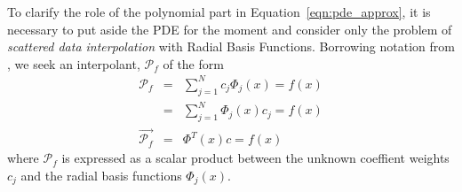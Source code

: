 \documentclass{report}
\begin{document}
{To clarify the role of the polynomial part in Equation~\ref{eqn:pde_approx}, it is necessary to
put aside the PDE for the moment and consider only the problem of \emph{scattered data 
interpolation} with Radial Basis Functions. Borrowing notation from \cite{Fasshauer2007, Iske2004}, 
we seek an interpolant, $\mathcal{P}_f$ of the form
\begin{eqnarray*}
\mathcal{P}_f  & = & \sum_{j=1}^{N} c_{j}  \Phi_j(x) = f(x) \\
			& = & \sum_{j=1}^{N} \Phi_j(x) c_{j} = f(x) \\
\vec{\mathcal{P}_f} & = & {\Phi}^T(x) c = f(x)
\end{eqnarray*}
where $\mathcal{P}_f$ is expressed as a scalar product between the unknown coeffient weights $c_j$ and the radial basis functions $\Phi_j(x)$.


}
\end{document}
